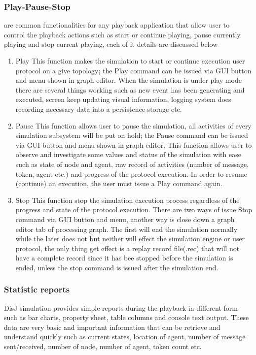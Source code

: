 \subsubsection*{Play-Pause-Stop}
  are common functionalities for any playback application that allow user to control the playback actions such as start or continue playing, pause currently playing and stop current playing, each of it details are discussed below

\begin{enumerate}
\item Play
This function makes the simulation to start or continue execution user protocol on a give topology; the Play command can be issued via GUI button and menu shown in graph editor. When the simulation is under play mode there are several things working such as new event has been generating and executed, screen keep updating visual information, logging system does recording necessary data into a persistence storage etc.

\item Pause
This function allows user to pause the simulation, all activities of every simulation subsystem will be put on hold; the Pause command can be issued via GUI button and menu  shown in graph editor. This function allows user to observe and investigate some values and status of the simulation with ease such as state of node and agent, raw record of activities (number of message, token, agent etc.) and progress of the protocol execution. In order to resume (continue) an execution, the user must issue a Play command again.

\item Stop
This function stop the simulation execution process regardless of the progress and state of the protocol execution. There are two ways of issue Stop command via GUI button and menu, another way is close down a graph editor tab of processing graph. The first will end the simulation normally while the later does not but neither will effect the simulation engine or user protocol, the only thing get effect is a replay record file(.rec) that will not have a complete record since it has bee stopped before the simulation is ended, unless the stop command is issued after the simulation end.
\end{enumerate}

\subsubsection*{Statistic reports}
DisJ simulation provides simple reports during the playback in different form such as bar charts, property sheet, table columns and console text output. These data are very basic and important information that can be retrieve and understand quickly such as current states, location of agent, number of message sent/received, number of node, number of agent, token count etc.

